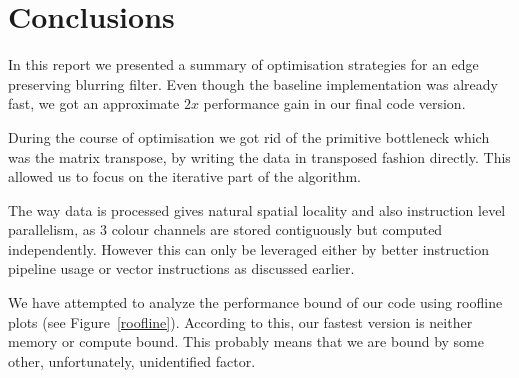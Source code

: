 \section{Conclusions}

In this report we presented a summary of optimisation strategies for an edge preserving blurring filter. Even though the baseline implementation was already fast, we got an approximate $2x$ performance gain in our final code version.

During the course of optimisation we got rid of the primitive bottleneck which was the matrix transpose, by writing the data in transposed fashion directly. This allowed us to focus on the iterative part of the algorithm.

The way data is processed gives natural spatial locality and also instruction level parallelism, as 3 colour channels are stored contiguously but computed independently. However this can only be leveraged either by better instruction pipeline usage or vector instructions as discussed earlier. 

We have attempted to analyze the performance bound of our code using roofline plots (see Figure~\ref{roofline}). According to this, our fastest version is neither memory or compute bound. This probably means that we are bound by some other, unfortunately, unidentified factor. 

